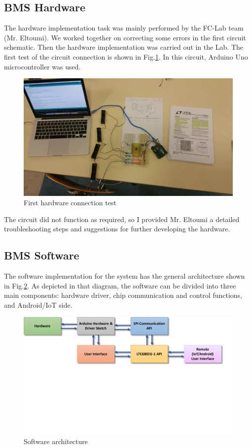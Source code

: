 \documentclass[%
DIV=12,
abstract=on
12pt,			%
]
{scrartcl} %
\begin{document}
\subsection{BMS Hardware}
The hardware implementation task was mainly performed by the FC-Lab team (Mr. Eltoumi). We worked together on correcting some errors in the first circuit schematic. Then the hardware implementation was carried out in the Lab. The first test of the circuit connection is shown in Fig.\ref{fig:hwconnection}.  In this circuit, Arduino Uno microcontroller was used.
\begin{figure}[h]
    \centering
    \includegraphics[width=0.8\linewidth]{figures/HWconnection}
    \caption{First hardware connection test}
    \label{fig:hwconnection}
\end{figure}

The circuit did not function as required, so I provided Mr. Eltoumi a detailed troubleshooting steps and suggestions for further developing the hardware.

\subsection{BMS Software}
The software implementation for the system has the general architecture shown in Fig.\ref{fig:softwarearchitecture}. As depicted in that diagram, the software can be divided into three main components: hardware driver, chip communication and control functions, and Android/IoT side.
\begin{figure}
    \centering
    \includegraphics[width=0.8\linewidth]{figures/SoftwareArchitecture}
    \caption{Software architecture}
    \label{fig:softwarearchitecture}
\end{figure}
\end{document}
